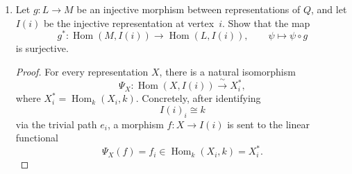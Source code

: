 \documentclass[11pt, a4paper]{article}
\begin{document}
\begin{enumerate}[leftmargin=*, label=\textbf{\arabic*.}]
\begin{proof}
    Let
    \[
    g_\ast \colon \operatorname{Hom}(P(i),M)\longrightarrow \operatorname{Hom}(P(i),N),
    \qquad
    \varphi \longmapsto g\circ \varphi .
    \]
    We must show that \(g_\ast\) is surjective.
    
    Recall that for every representation \(X\in \operatorname{Rep}Q\), there is a natural isomorphism
    \[
    \Phi_X \colon \operatorname{Hom}(P(i),X)\xrightarrow{\;\sim\;} X_i,
    \qquad
    f\longmapsto f_i(e_i),
    \]
    where \(e_i\) denotes the trivial path at the vertex \(i\).
    
    We claim that the following diagram commutes:
    \[
    \begin{tikzcd}
    \operatorname{Hom}(P(i),M) \arrow[r, "\Phi_M", "\sim"'] \arrow[d, "g_\ast"'] 
    & M_i \arrow[d, "g_i"] \\
    \operatorname{Hom}(P(i),N) \arrow[r, "\Phi_N", "\sim"'] 
    & N_i
    \end{tikzcd}
    \]
    Indeed, for any \(f\in \operatorname{Hom}(P(i),M)\), we have
    \[
    \Phi_N\bigl(g_\ast(f)\bigr)
    =
    \Phi_N(g\circ f)
    =
    (g\circ f)_i(e_i)
    =
    g_i\bigl(f_i(e_i)\bigr)
    =
    g_i\bigl(\Phi_M(f)\bigr).
    \]
    Thus
    \[
    \Phi_N\circ g_\ast = g_i\circ \Phi_M.
    \]
    
    Since \(g\colon M\to N\) is surjective, each component map
    \[
    g_j\colon M_j\to N_j
    \]
    is surjective. In particular, \(g_i\colon M_i\to N_i\) is surjective. Because \(\Phi_M\) and \(\Phi_N\) are isomorphisms, the commutative diagram above shows that \(g_\ast\) corresponds to the surjective map \(g_i\). Hence \(g_\ast\) is surjective.
    
    Therefore every morphism \(P(i)\to N\) lifts to a morphism \(P(i)\to M\), as required.
    \end{proof}

\item Let $g \colon L \to M$ be an injective morphism between representations of $Q$, and let $I(i)$ be the injective representation at vertex~$i$. Show that the map
\[
g^\ast \colon \operatorname{Hom}(M, I(i)) \to \operatorname{Hom}(L, I(i)),\qquad \psi \longmapsto \psi \circ g
\]
is surjective.

\begin{proof}
    For every representation \(X\), there is a natural isomorphism
    \[
    \Psi_X \colon \operatorname{Hom}(X,I(i)) \xrightarrow{\;\sim\;} X_i^{\ast},
    \]
    where \(X_i^{\ast}=\operatorname{Hom}_k(X_i,k)\). Concretely, after identifying
    \[
    I(i)_i \cong k
    \]
    via the trivial path \(e_i\), a morphism \(f\colon X\to I(i)\) is sent to the linear functional
    \[
    \Psi_X(f)=f_i \in \operatorname{Hom}_k(X_i,k)=X_i^{\ast}.
    \]
    

\end{proof}
\end{enumerate}
\end{document}
